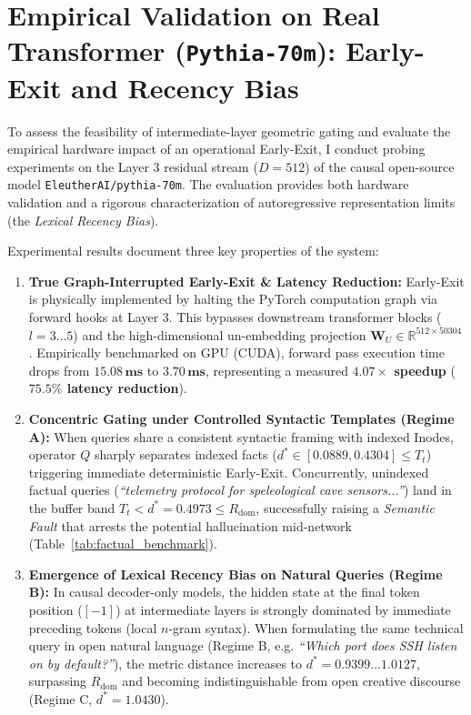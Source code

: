 \documentclass[11pt,a4paper]{article}
\theoremstyle{definition}
\begin{document}
\section{Empirical Validation on Real Transformer (\texttt{Pythia-70m}): Early-Exit and Recency Bias}

To assess the feasibility of intermediate-layer geometric gating and evaluate the empirical hardware impact of an operational Early-Exit, I conduct probing experiments on the Layer 3 residual stream ($D=512$) of the causal open-source model \texttt{EleutherAI/pythia-70m}. The evaluation provides both hardware validation and a rigorous characterization of autoregressive representation limits (the \textit{Lexical Recency Bias}).

Experimental results document three key properties of the system:

\begin{enumerate}[leftmargin=*, itemsep=2.5pt]
    \item \textbf{True Graph-Interrupted Early-Exit \& Latency Reduction:} Early-Exit is physically implemented by halting the PyTorch computation graph via forward hooks at Layer 3. This bypasses downstream transformer blocks ($l=3 \dots 5$) and the high-dimensional un-embedding projection $\mathbf{W}_U \in \mathbb{R}^{512 \times 50304}$. Empirically benchmarked on GPU (CUDA), forward pass execution time drops from $\mathbf{15.08\,\text{ms}}$ to $\mathbf{3.70\,\text{ms}}$, representing a measured \textbf{$4.07\times$ speedup} (\textbf{$75.5\%$ latency reduction}).
    \item \textbf{Concentric Gating under Controlled Syntactic Templates (Regime A):} When queries share a consistent syntactic framing with indexed Inodes, operator $Q$ sharply separates indexed facts ($d^* \in [0.0889, 0.4304] \le T_t$) triggering immediate deterministic Early-Exit. Concurrently, unindexed factual queries (\textit{``telemetry protocol for speleological cave sensors...''}) land in the buffer band $T_t < d^* = 0.4973 \le R_{\mathrm{dom}}$, successfully raising a \textit{Semantic Fault} that arrests the potential hallucination mid-network (Table~\ref{tab:factual_benchmark}).
    \item \textbf{Emergence of Lexical Recency Bias on Natural Queries (Regime B):} In causal decoder-only models, the hidden state at the final token position ($[-1]$) at intermediate layers is strongly dominated by immediate preceding tokens (local $n$-gram syntax). When formulating the same technical query in open natural language (Regime B, e.g. \textit{``Which port does SSH listen on by default?''}), the metric distance increases to $d^* = 0.9399 \dots 1.0127$, surpassing $R_{\mathrm{dom}}$ and becoming indistinguishable from open creative discourse (Regime C, $d^* = 1.0430$).
\end{enumerate}
\end{document}
